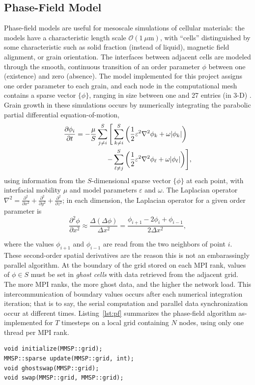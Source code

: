 \documentclass[11pt]{article}
\begin{document}
\begin{multicols*}{2}
\subsection*{Phase-Field Model}
Phase-field models are useful for mesoscale simulations of cellular materials:
the models have a characteristic length scale $\mathcal{O}(1\ \mu\mathrm{m})$, with ``cells'' distinguished by some characteristic such as solid fraction (instead of liquid), magnetic field alignment, or grain orientation.
The interfaces between adjacent cells are modeled through the smooth, continuous transition of an order parameter $\phi$ between one (existence) and zero (absence).
The model implemented for this project assigns one order parameter to each grain, and each node in the computational mesh contains a sparse vector $\{\phi\}$, ranging in size between one and 27 entries (in 3-D) \cite{Steinbach1999}.
Grain growth in these simulations occurs by numerically integrating the parabolic partial differential equation-of-motion,
\begin{align}
\frac{\partial\phi_i}{\partial t} = -\frac{\mu}{S}\sum\limits_{j\neq i}^S\Bigg[
  &\sum\limits_{k\neq i}^S\bigg(\frac{1}{2}\varepsilon^2\nabla^2\phi_k+\omega|\phi_k|\bigg)\notag\\
  -&\sum\limits_{\ell\neq j}^S\bigg(\frac{1}{2}\varepsilon^2\nabla^2\phi_\ell+\omega|\phi_\ell|\bigg)\Bigg],\label{eqn:pf}
\end{align}
using information from the $S$-dimensional sparse vector $\{\phi\}$ at each point, with interfacial mobility $\mu$ and model parameters $\varepsilon$ and $\omega$.
The Laplacian operator $\nabla^2 = \frac{\partial^2}{\partial x^2} + \frac{\partial^2}{\partial y^2} + \frac{\partial^2}{\partial z^2}$;
in each dimension, the Laplacian operator for a given order parameter is
\begin{equation}
\frac{\partial^2\phi}{\partial x^2} \approx \frac{\Delta(\Delta\phi)}{\Delta x^2} = \frac{\phi_{i+1} - 2\phi_i + \phi_{i-1}}{2\Delta x^2},\label{eqn:laplacian}
\end{equation}

where the values $\phi_{i+1}$ and $\phi_{i-1}$ are read from the two neighbors of point $i$. 
These second-order spatial derivatives are the reason this is not an embarassingly parallel algorithm.
At the boundary of the grid stored on each MPI rank, values of $\phi\in S$ must be set in \emph{ghost cells} with data retrieved from the adjacent grid.
The more MPI ranks, the more ghost data, and the higher the network load.
This intercommunication of boundary values occurs after each numerical integration iteration; that is to say, the serial computation and parallel data synchronization occur at different times.
Listing~\ref{lst:pf} summarizes the phase-field algorithm as-implemented for $T$ timesteps on a local grid containing $N$ nodes, using only one thread per MPI rank.
\begin{minipage}{0.475\textwidth}
\begin{center}
\begin{lstlisting}
void initialize(MMSP::grid);
MMSP::sparse update(MMSP::grid, int);
void ghostswap(MMSP::grid);
void swap(MMSP::grid, MMSP::grid);


\end{lstlisting}
\end{center}
\end{minipage}
\end{multicols*}
\end{document}
